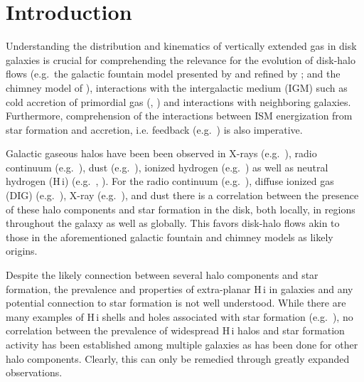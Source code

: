\documentclass{emulateapj}
\begin{document}
\section{Introduction} \label{Section1}


\par
     Understanding the distribution and kinematics of vertically extended gas in disk galaxies is crucial for comprehending the relevance for the evolution of disk-halo flows (e.g.\ the galactic fountain model presented by \citealt{1976ApJ...205..762S} and refined by \citealt{1980ApJ...236..577B}; and the chimney model of \citealt{1989ApJ...345..372N}), interactions with the intergalactic medium (IGM) such as cold accretion of primordial gas (\citealt{2005MNRAS.363....2K}, \citealt{2008A&ARv..15..189S}) and interactions with neighboring galaxies.  Furthermore, comprehension of the interactions between ISM energization from star formation and accretion, i.e. feedback (e.g.\ \citealt{2000MNRAS.317..697E}) is also imperative.   

\par
    Galactic gaseous halos have been been observed in X-rays (e.g.\ \citealt{2006A&A...448...43T}), radio continuum (e.g.\ \citealt{1999AJ....117.2102I}), dust (e.g.\ \citealt{1999AJ....117.2077H}), ionized hydrogen (e.g.\ \citealt{2003A&A...406..493R}) as well as neutral hydrogen ({\sc H\,i}) (e.g.\ \citealt{1997ApJ...491..140S}, \citealt{2007AJ....134.1019O}).   For the radio continuum (e.g.\ \citealt{2006A&A...457..121D}), diffuse ionized gas (DIG) (e.g.\ \citealt{2003A&A...406..493R}), X-ray (e.g.\ \citealt{2006A&A...457..779T}), and dust \citep{1999AJ....117.2077H} there is a correlation between the presence of these halo components and star formation in the disk, both locally, in regions throughout the galaxy as well as globally.  This favors disk-halo flows akin to those in the aforementioned galactic fountain and chimney models as likely origins.  

\par
    Despite the likely connection between several halo components and star formation, the prevalence and properties of extra-planar {\sc H\,i} in galaxies and any potential connection to star formation is not well understood.  While there are many examples of {\sc H\,i} shells and holes associated with star formation (e.g.\ \citealt{2008A&A...490..555B}), no correlation between the prevalence of widespread {\sc H\,i} halos and star formation activity has been established among multiple galaxies as has been done for other halo components. Clearly, this can only be remedied through greatly expanded observations.
\end{document}
